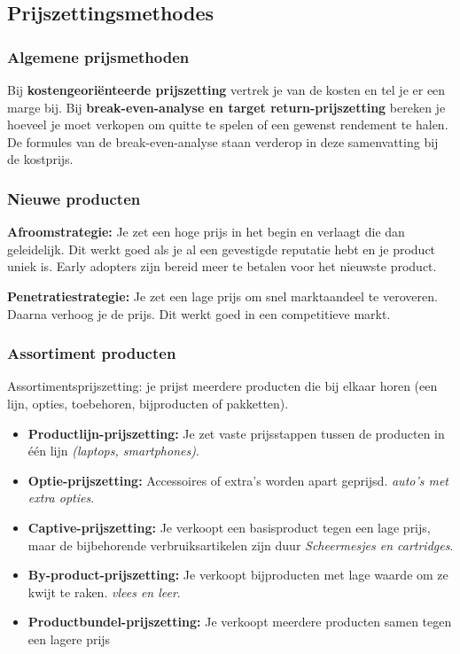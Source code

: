 \documentclass[a4paper,11pt]{article}
\begin{document}
\subsection{Prijszettingsmethodes}

\subsubsection{Algemene prijsmethoden}
Bij \textbf{kostengeoriënteerde prijszetting} vertrek je van de kosten en tel je er een marge bij.
Bij \textbf{break-even-analyse en target return-prijszetting} bereken je hoeveel je moet verkopen om quitte te spelen of een gewenst rendement te halen.
De formules van de break-even-analyse staan verderop in deze samenvatting bij de kostprijs.

\subsubsection{Nieuwe producten}

\textbf{Afroomstrategie:} Je zet een hoge prijs
in het begin en verlaagt die dan geleidelijk.
Dit werkt goed als je al een gevestigde reputatie hebt en je product
uniek is. Early adopters zijn bereid meer te betalen voor het nieuwste product.
\newline

\textbf{Penetratiestrategie:} Je zet een lage prijs om snel marktaandeel te veroveren.
Daarna verhoog je de prijs.
Dit werkt goed in een competitieve markt.


\subsubsection{Assortiment producten}
Assortimentsprijszetting: je prijst meerdere producten die bij elkaar horen (een lijn, opties, toebehoren, bijproducten of pakketten).

\begin{itemize}
    \item \textbf{Productlijn-prijszetting:} Je zet vaste prijsstappen tussen de producten in één lijn \textit{(laptops, smartphones)}.
    \item \textbf{Optie-prijszetting:} Accessoires of extra's worden apart geprijsd. \textit{auto's met extra opties}.
    \item \textbf{Captive-prijszetting:} Je verkoopt een basisproduct tegen een lage prijs, maar de bijbehorende
          verbruiksartikelen zijn duur \textit{Scheermesjes en cartridges}.
    \item \textbf{By-product-prijszetting:} Je verkoopt bijproducten met lage waarde
          om ze kwijt te raken. \textit{vlees en leer}.
    \item \textbf{Productbundel-prijszetting:} Je verkoopt meerdere producten
          samen tegen een lagere prijs
\end{itemize}
\end{document}
